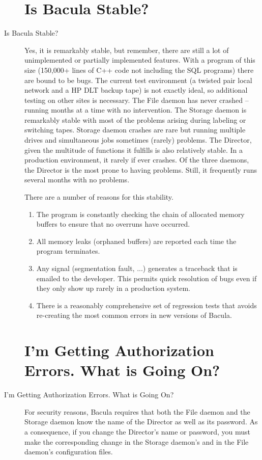 \begin{description}
\label{stable}
\section{Is Bacula Stable?}
\item [Is Bacula Stable? ]
   Yes, it is remarkably stable, but remember, there are still a lot of
   unimplemented or partially implemented features.  With a program of this
   size (150,000+ lines of C++ code not including the SQL programs) there
   are bound to be bugs.  The current test environment (a twisted pair
   local network and a HP DLT backup tape) is not exactly ideal, so
   additional testing on other sites is necessary.  The File daemon has
   never crashed -- running months at a time with no intervention.  The
   Storage daemon is remarkably stable with most of the problems arising
   during labeling or switching tapes.  Storage daemon crashes are rare
   but running multiple drives and simultaneous jobs sometimes (rarely)
   problems.
   The Director, given the multitude of functions it fulfills is also
   relatively stable.  In a production environment, it rarely if ever
   crashes.  Of the three daemons, the Director is the most prone to having
   problems.  Still, it frequently runs several months with no problems.

   There are a number of reasons for this stability.

   \begin{enumerate}
   \item  The program is constantly checking the chain of allocated
      memory buffers to ensure that no overruns have occurred.  \\
   \item All  memory leaks (orphaned buffers) are reported each time the
      program  terminates.\\
   \item Any signal (segmentation fault, ...) generates a
      traceback that is emailed to the developer.  This permits quick
      resolution of bugs even if they only show up rarely in a production
      system.\\
   \item There is a reasonably comprehensive set of regression tests
      that avoids re-creating the most common errors in new versions of
      Bacula.
   \end{enumerate}

\label{AuthorizationErrors}
\section{I'm Getting Authorization Errors. What is Going On? }
\item [I'm Getting Authorization Errors. What is Going On? ]
   For security reasons, Bacula requires that both  the File daemon and the
   Storage daemon know the name  of the Director as well as its password. As a
   consequence,  if you change the Director's name or password, you must  make
   the corresponding change in the Storage daemon's and  in the File daemon's
   configuration files.


\end{description}
